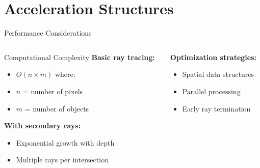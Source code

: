 
\section{Acceleration Structures}

\begin{frame}{Performance Considerations}
  \begin{columns}
    \begin{column}{0.6\textwidth}
      \begin{raybox}{Computational Complexity}
        \small
        \textbf{Basic ray tracing:}
        \begin{itemize}
          \item $O(n \times m)$ where:
          \item $n$ = number of pixels
          \item $m$ = number of objects
        \end{itemize}

        \vspace{0.3cm}
        \textbf{With secondary rays:}
        \begin{itemize}
          \item Exponential growth with depth
          \item Multiple rays per intersection
        \end{itemize}
      \end{raybox}
    \end{column}
    \begin{column}{0.4\textwidth}

      \vspace{0.3cm}
      \textbf{Optimization strategies:}
      \begin{itemize}
        \item Spatial data structures
        \item Parallel processing
        \item Early ray termination
      \end{itemize}
    \end{column}
  \end{columns}
\end{frame}


